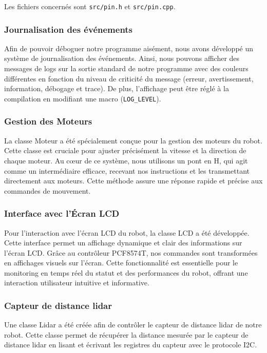 Les fichiers concernés sont \texttt{src/pin.h} et \texttt{src/pin.cpp}.

\subsubsection{Journalisation des événements}

Afin de pouvoir déboguer notre programme aisément, nous avons développé un système de journalisation des événements.
Ainsi, nous pouvons afficher des messages de logs sur la sortie standard de notre programme avec des couleurs différentes en fonction du niveau de criticité du message (erreur, avertissement, information, débogage et trace).
De plus, l'affichage peut être réglé à la compilation en modifiant une macro (\texttt{LOG\_LEVEL}).

\subsubsection{Gestion des Moteurs}
La classe Moteur a été spécialement conçue pour la gestion des moteurs du robot. Cette classe est cruciale pour ajuster précisément la vitesse et la direction de chaque moteur. Au cœur de ce système, nous utilisons un pont en H, qui agit comme un intermédiaire efficace, recevant nos instructions et les transmettant directement aux moteurs. Cette méthode assure une réponse rapide et précise aux commandes de mouvement.

\subsubsection*{Interface avec l'Écran LCD}
Pour l'interaction avec l'écran LCD du robot, la classe LCD a été développée. Cette interface permet un affichage dynamique et clair des informations sur l'écran LCD. Grâce au contrôleur PCF8574T, nos commandes sont transformées en affichages visuels sur l'écran. Cette fonctionnalité est essentielle pour le monitoring en temps réel du statut et des performances du robot, offrant une interaction utilisateur intuitive et informative.


\subsubsection*{Capteur de distance lidar}

Une classe Lidar a été créée afin de contrôler le capteur de distance lidar de notre robot.
Cette classe permet de récupérer la distance mesurée par le capteur de distance lidar en lisant et écrivant les registres du capteur avec le protocole I2C.

